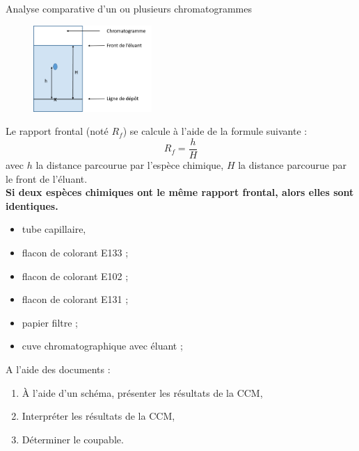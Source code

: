 \begin{doc}{Analyse comparative d'un ou plusieurs chromatogrammes}
\begin{figure}
\vspace{-1cm}
    \centering
      \includegraphics[width=0.4\textwidth]{Images/Chromatogramme.png}
  \end{figure}
    Le rapport frontal (noté $R_f$) se calcule à l'aide de la formule suivante :
\begin{equation*}
    R_f = \frac{h}{H}
\end{equation*}
avec $h$ la distance parcourue par l'espèce chimique, $H$ la distance parcourue par le front de l'éluant.\\
\textbf{Si deux espèces chimiques ont le même rapport frontal, alors elles sont identiques.}

\end{doc}



\begin{mdframed}[style=autreexo]
\textbf{}
\begin{itemize}
    \item tube capillaire,
    \item flacon de colorant E133 ;
    \item flacon de colorant E102 ;
    \item flacon de colorant E131 ;
    \item papier filtre ;
    \item cuve chromatographique avec éluant ;
\end{itemize}
\end{mdframed}
A l’aide des documents :
\begin{enumerate}
    \item À l’aide d’un schéma, présenter les résultats de la CCM,
    \item Interpréter les résultats de la CCM,
    \item Déterminer le coupable.
\end{enumerate}
